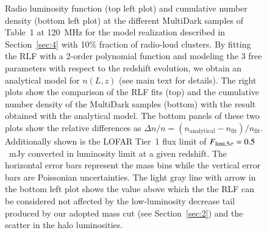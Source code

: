 \documentclass[traditabstract]{aa}
\newcommand{\rmn}{\mathrm}
\begin{document}
\begin{figure}[hbt!]
\caption{Radio luminosity function (top left plot) and cumulative number density (bottom left plot) at the different MultiDark samples of Table~1 at 120~MHz for the model realization described in Section~\ref{sec:4} with 10\% fraction of radio-loud clusters. By fitting the RLF with a 2-order polynomial function and modeling the 3 free parameters with respect to the redshift evolution, we obtain an analytical model for $n(L,z)$ (see main text for details). The right plots show the comparison of the RLF fits (top) and the cumulative number density of the MultiDark samples (bottom) with the result obtained with the analytical model. The bottom panels of these two plots show the relative differences as $\Delta n / n = (n_{\rmn{analytical}} - n_{\rmn{fit}})/n_{\rmn{fit}}$. Additionally shown is the LOFAR Tier~1 flux limit of $F_{\rm{limi},5\sigma}=0.5$~mJy \citep{2012JApA..tmp...34R} converted in luminosity limit at a given redshift. The horizontal error bars represent the mass bins while the vertical error bars are Poissonian uncertainties. The light gray line with arrow in the bottom left plot shows the value above which the the RLF can be considered not affected by the low-luminosity decrease tail produced by our adopted mass cut (see Section~\ref{sec:2}) and the scatter in the halo luminosities.}
\label{fig:RLF_120}
\end{figure} 
 
\end{document}
